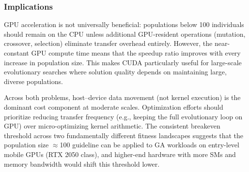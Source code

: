 \documentclass[a4paper,14pt]{extarticle}
\begin{document}
\subsubsection*{Implications}

GPU acceleration is not universally beneficial: populations below 100 individuals should remain on the CPU unless additional GPU-resident operations (mutation, crossover, selection) eliminate transfer overhead entirely. However, the near-constant GPU compute time means that the speedup ratio improves with every increase in population size. This makes CUDA particularly useful for large-scale evolutionary searches where solution quality depends on maintaining large, diverse populations.

Across both problems, host--device data movement (not kernel execution) is the dominant cost component at moderate scales. Optimization efforts should prioritize reducing transfer frequency (e.g., keeping the full evolutionary loop on GPU) over micro-optimizing kernel arithmetic. The consistent breakeven threshold across two fundamentally different fitness landscapes suggests that the population size $\approx$100 guideline can be applied to GA workloads on entry-level mobile GPUs (RTX 2050 class), and higher-end hardware with more SMs and memory bandwidth would shift this threshold lower.
\end{document}
